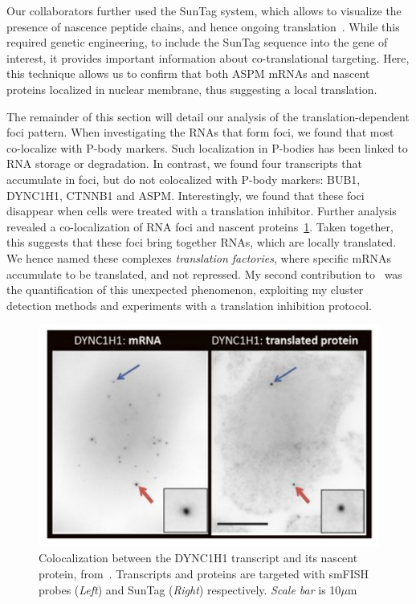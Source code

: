 Our collaborators further used the SunTag system, which allows to visualize the presence of nascence peptide chains, and hence ongoing translation~\cite{pichon_visualization_2016, Pichon_2018, Wu_2016}.
While this required genetic engineering, to include the SunTag sequence into the gene of interest, it provides important information about co-translational targeting.
Here, this technique allows us to confirm that both ASPM \ac{mRNA}s and nascent proteins localized in nuclear membrane, thus suggesting a local translation.

The remainder of this section will detail our analysis of the translation-dependent foci pattern.
When investigating the \ac{RNA}s that form foci, we found that most co-localize with P-body markers.
Such localization in P-bodies has been linked to RNA storage or degradation.
In contrast, we found four transcripts that accumulate in foci, but do not colocalized with P-body markers: BUB1, DYNC1H1, CTNNB1 and ASPM.
Interestingly, we found that these foci disappear when cells were treated with a translation inhibitor.
Further analysis revealed a co-localization of RNA foci and nascent proteins~\ref{fig:translation_factory}.
Taken together, this suggests that these foci bring together RNAs, which are locally translated.
We hence named these complexes \emph{translation factories}, where specific \ac{mRNA}s accumulate to be translated, and not repressed.
My second contribution to~\cite{CHOUAIB_2020} was the quantification of this unexpected phenomenon, exploiting my cluster detection methods and experiments with a translation inhibition protocol.

\begin{figure}[]
    \centering
    \includegraphics[width=\textwidth]{figures/chapter5/translation_factory}
    \caption[smFISH and SunTag images of DYNC1H1]{Colocalization between the DYNC1H1 transcript and its nascent protein, from~\cite{pichon_visualization_2016}.
	Transcripts and proteins are targeted with smFISH probes (\textit{Left}) and SunTag (\textit{Right}) respectively.
	\textit{Scale bar} is 10$\mu$m}
    \label{fig:translation_factory}
\end{figure}

